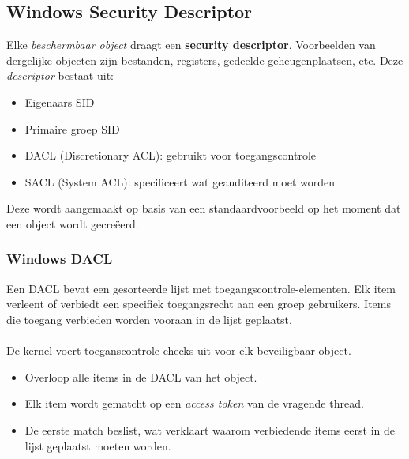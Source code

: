 \documentclass[../main.tex]{subfiles}
\begin{document}
\subsection{Windows Security Descriptor}
Elke \textit{beschermbaar object} draagt een \textbf{security descriptor}. Voorbeelden van dergelijke objecten zijn bestanden, registers, gedeelde geheugenplaatsen, etc. Deze \textit{descriptor} bestaat uit:
\begin{itemize}
	\item Eigenaars SID
	\item Primaire groep SID
	\item DACL (Discretionary ACL): gebruikt voor toegangscontrole
	\item SACL (System ACL): specificeert wat geauditeerd moet worden
\end{itemize}
Deze wordt aangemaakt op basis van een standaardvoorbeeld op het moment dat een object wordt gecreëerd. 

\subsubsection{Windows DACL}
Een DACL bevat een gesorteerde lijst met toegangscontrole-elementen. Elk item verleent of verbiedt een specifiek toegangsrecht aan een groep gebruikers. Items die toegang verbieden worden vooraan in de lijst geplaatst.
\\\\
De kernel voert toeganscontrole checks uit voor elk beveiligbaar object.
\begin{itemize}
	\item Overloop alle items in de DACL van het object.
	\item Elk item wordt gematcht op een \textit{access token} van de vragende thread.
	\item De eerste match beslist, wat verklaart waarom verbiedende items eerst in de lijst geplaatst moeten worden.
\end{itemize}
\end{document}
